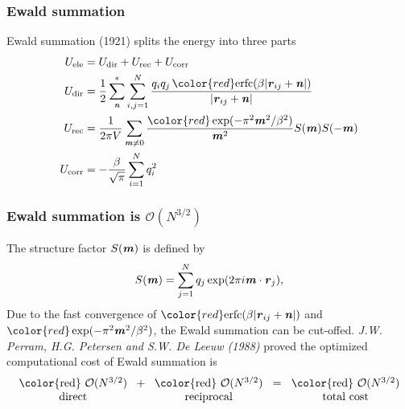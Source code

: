 \documentclass{beamer}
\newcommand{\redc}[1]{{\color{red} #1}}
\newcommand{\bluec}[1]{{\color{blue} #1}}
\renewcommand{\v}[1]{\textbf{\textit{#1}}}
\begin{document}
\begin{frame}[label=Ewald]
  \frametitle{Ewald summation} Ewald summation (1921) splits the
  energy into three parts
  \bluec{
  \begin {align*}
    U_{\textrm{ele}} &=  U_{\textrm{dir}} + U_{\textrm{rec}}+ U_{\textrm{corr}}\\
    U_{\textrm{dir}} & = \frac12 \sum^{\ast}_{\v n}
    \sum_{i,j = 1}^{N} \frac{q_iq_j\, \redc{\textrm{erfc}(\beta \vert\v{r}_{ij} + \v{n}\vert)}}
    {\vert\v{r}_{ij} + \v{n}\vert} \\ \label{Erec-ewald}
    U_{\textrm{rec}} & = \frac1{2\pi V} \sum_{\v m \neq 0}
    \frac{\redc{\exp(-\pi^2\v m^2 / \beta^2)}}{\v m^2} S(\v m) S(-\v m) \\
    U_{\textrm{corr}}& = -\frac\beta{\sqrt \pi} \sum_{i=1}^N q_i^2
  \end {align*}}
  \vfill
  \hfill
  \hyperlink{key-idea-spme}{}
\end{frame}

\begin{frame}
  \frametitle{Ewald summation is $\mathcal O(N^{3/2})$} 
  The structure factor $S(\v m)$ is
  defined by \bluec{
    \begin{equation*}\label{sm1}
      S(\v m) = \sum_{j=1}^N q_j \exp (2 \pi i \v m \cdot \v r_j),
    \end{equation*}}
  Due to the fast convergence of 
  $\redc{\textrm{erfc}(\beta \vert\v{r}_{ij} + \v{n}\vert)}$ and 
  $\redc{\exp(-\pi^2\v m^2 / \beta^2)}$, the Ewald summation can be cut-offed.
  \vfill
  \bluec{\textit{J.W. Perram, H.G. Petersen and S.W. De Leeuw (1988)}}
  proved the optimized computational cost of Ewald summation is 
  \begin{align*}
    \begin{tabular}[t]{c}
      \redc{$\mathcal O(N^{3/2})$}\\
      {direct}
    \end{tabular}
    +
    \begin{tabular}[t]{c}
      \redc{$\mathcal O(N^{3/2})$}\\
      {reciprocal}
    \end{tabular}
    =
    \begin{tabular}[t]{c}
      \redc{$\mathcal O(N^{3/2})$}\\
      {total cost}
    \end{tabular}
  \end{align*} 
 \vfill 
\end{frame}
\end{document}
